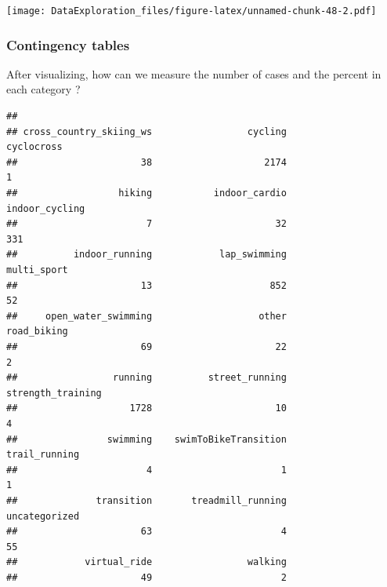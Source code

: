 \documentclass[
]{book}
\newenvironment{Shaded}{\begin{snugshade}}{\end{snugshade}}
\newcommand{\DecValTok}[1]{\textcolor[rgb]{0.00,0.00,0.81}{#1}}
\newcommand{\KeywordTok}[1]{\textcolor[rgb]{0.13,0.29,0.53}{\textbf{#1}}}
\newcommand{\NormalTok}[1]{#1}
\newcommand{\OperatorTok}[1]{\textcolor[rgb]{0.81,0.36,0.00}{\textbf{#1}}}
\newcommand{\StringTok}[1]{\textcolor[rgb]{0.31,0.60,0.02}{#1}}
\begin{document}
\texttt{[image: DataExploration\_files/figure-latex/unnamed-chunk-48-2.pdf]}

\hypertarget{contingency-tables}{%
\subsubsection{Contingency tables}\label{contingency-tables}}

After visualizing, how can we measure the number of cases and the percent in each category ?

\begin{Shaded}
\end{Shaded}

\begin{verbatim}
## 
## cross_country_skiing_ws                 cycling              cyclocross 
##                      38                    2174                       1 
##                  hiking           indoor_cardio          indoor_cycling 
##                       7                      32                     331 
##          indoor_running            lap_swimming             multi_sport 
##                      13                     852                      52 
##     open_water_swimming                   other             road_biking 
##                      69                      22                       2 
##                 running          street_running       strength_training 
##                    1728                      10                       4 
##                swimming    swimToBikeTransition           trail_running 
##                       4                       1                       1 
##              transition       treadmill_running           uncategorized 
##                      63                       4                      55 
##            virtual_ride                 walking 
##                      49                       2
\end{verbatim}

\begin{Shaded}
\end{Shaded}
\end{document}
